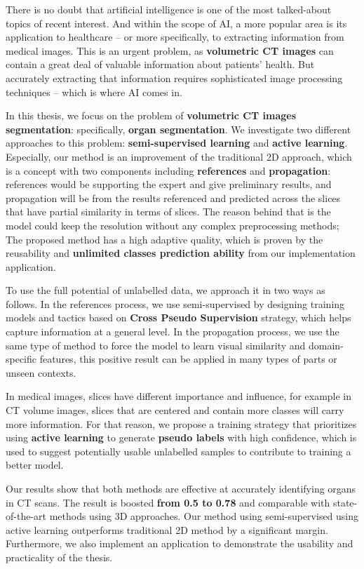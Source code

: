\begin{EnAbstract}
There is no doubt that artificial intelligence is one of the most talked-about topics of recent interest. And within the scope of AI, a more popular area is its application to healthcare – or more specifically, to extracting information from medical images. This is an urgent problem, as \textbf{volumetric CT images} can contain a great deal of valuable information about patients' health. But accurately extracting that information requires sophisticated image processing techniques – which is where AI comes in.

In this thesis, we focus on the problem of \textbf{volumetric CT images segmentation}: specifically, \textbf{organ segmentation}. We investigate two different approaches to this problem: \textbf{semi-supervised learning} and \textbf{active learning}. Especially, our method is an improvement of the traditional 2D approach, which is a concept with two components including \textbf{references} and \textbf{propagation}: references would be supporting the expert and give preliminary results, and propagation will be from the results referenced and predicted across the slices that have partial similarity in terms of slices. The reason behind that is the model could keep the resolution without any complex preprocessing methods; The proposed method has a high adaptive quality, which is proven by the reusability and \textbf{unlimited classes prediction ability} from our implementation application.

To use the full potential of unlabelled data, we approach it in two ways as follows. In the references process, we use semi-supervised by designing training models and tactics based on \textbf{Cross Pseudo Supervision} strategy, which helps capture information at a general level. In the propagation process, we use the same type of method to force the model to learn visual similarity and domain-specific features, this positive result can be applied in many types of parts or unseen contexts.

\pagebreak

In medical images, slices have different importance and influence, for example in CT volume images, slices that are centered and contain more classes will carry more information. For that reason, we propose a training strategy that prioritizes using \textbf{active learning} to generate \textbf{pseudo labels} with high confidence, which is used to suggest potentially usable unlabelled samples to contribute to training a better model.

Our results show that both methods are effective at accurately identifying organs in CT scans. The result is boosted \textbf{from 0.5 to 0.78} and comparable with state-of-the-art methods using 3D approaches. Our method using semi-supervised using active learning outperforms traditional 2D method by a significant margin. Furthermore, we also implement an application to demonstrate the usability and practicality of the thesis.
\end{EnAbstract}
